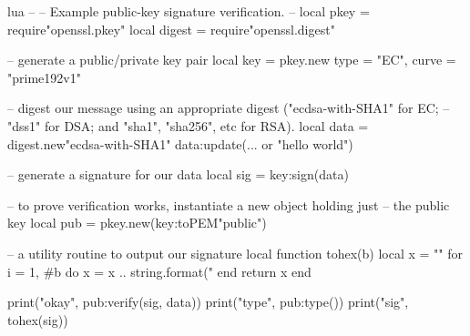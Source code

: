 \documentclass[11pt, oneside]{memoir}
\begin{document}
\begin{example}{lua}
--
-- Example public-key signature verification.
--
local pkey = require"openssl.pkey"
local digest = require"openssl.digest"

-- generate a public/private key pair
local key = pkey.new{ type = "EC", curve = "prime192v1" }

-- digest our message using an appropriate digest ("ecdsa-with-SHA1" for EC;
-- "dss1" for DSA; and "sha1", "sha256", etc for RSA).
local data = digest.new"ecdsa-with-SHA1"
data:update(... or "hello world")

-- generate a signature for our data
local sig = key:sign(data)

-- to prove verification works, instantiate a new object holding just
-- the public key
local pub = pkey.new(key:toPEM"public")

-- a utility routine to output our signature
local function tohex(b)
	local x = ""
	for i = 1, #b do
		x = x .. string.format("%
	end
	return x
end

print("okay", pub:verify(sig, data))
print("type", pub:type())
print("sig", tohex(sig))
\end{example}



\appendix
\printindex
\end{document}
